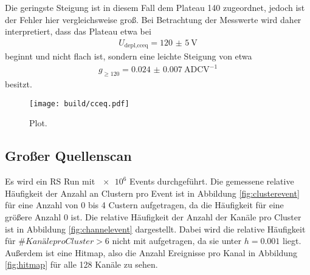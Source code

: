Die geringste Steigung ist in diesem Fall dem Plateau 140 zugeordnet, jedoch ist der Fehler hier vergleichsweise groß.
Bei Betrachtung der Messwerte wird daher interpretiert, dass das Plateau etwa bei
\begin{align}
  U_\text{depl,cceq} = \SI{120(5)}{\volt}
\end{align}
beginnt und nicht flach ist, sondern eine leichte Steigung von etwa
\begin{align}
  g_{\geq120} =  \SI{0.024(7)}{\text{ADC}\volt\tothe{-1}}
\end{align}
besitzt.

\begin{figure}
  \centering
  \texttt{[image: build/cceq.pdf]}
  \caption{Plot.}
  \label{fig:cceq}
\end{figure}

\subsection{Großer Quellenscan}

Es wird ein RS Run mit $\num{e6}$ Events durchgeführt. Die gemessene relative
Häufigkeit der Anzahl an Clustern pro Event ist in Abbildung \ref{fig:clusterevent} für eine Anzahl von 0 bis 4
Custern aufgetragen, da die Häufigkeit für eine größere Anzahl 0 ist. Die relative Häufigkeit der Anzahl der Kanäle pro Cluster ist
in Abbildung \ref{fig:channelevent} dargestellt. Dabei wird die relative Häufigkeit für $\# Kanäle pro Cluster > 6$
nicht mit aufgetragen, da sie unter $h = 0.001$ liegt. Außerdem ist eine Hitmap, also die Anzahl
Ereignisse pro Kanal in Abbildung \ref{fig:hitmap} für alle 128 Kanäle zu sehen.

